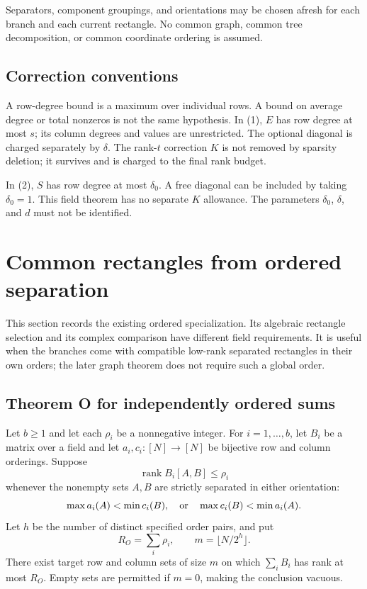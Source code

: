 \documentclass[
  11pt,
]{article}
\begin{document}
Separators, component groupings, and orientations may be chosen afresh
for each branch and each current rectangle. No common graph, common tree
decomposition, or common coordinate ordering is assumed.

\subsection{Correction conventions}\label{correction-conventions}

A row-degree bound is a maximum over individual rows. A bound on average
degree or total nonzeros is not the same hypothesis. In (1), \(E\) has
row degree at most \(s\); its column degrees and values are
unrestricted. The optional diagonal is charged separately by \(\delta\).
The rank-\(t\) correction \(K\) is not removed by sparsity deletion; it
survives and is charged to the final rank budget.

In (2), \(S\) has row degree at most \(\delta_0\). A free diagonal can
be included by taking \(\delta_0=1\). This field theorem has no separate
\(K\) allowance. The parameters \(\delta_0\), \(\delta\), and \(d\) must
not be identified.

\section{Common rectangles from ordered
separation}\label{common-rectangles-from-ordered-separation}

This section records the existing ordered specialization. Its algebraic
rectangle selection and its complex comparison have different field
requirements. It is useful when the branches come with compatible
low-rank separated rectangles in their own orders; the later graph
theorem does not require such a global order.

\subsection{Theorem O for independently ordered
sums}\label{theorem-o-for-independently-ordered-sums}

Let \(b\ge1\) and let each \(\rho_i\) be a nonnegative integer. For
\(i=1,\ldots,b\), let \(B_i\) be a matrix over a field and let
\(a_i,c_i:[N]\to[N]\) be bijective row and column orderings. Suppose \[
 \operatorname{rank}B_i[A,B]\le \rho_i
\] whenever the nonempty sets \(A,B\) are strictly separated in either
orientation: \[
 \max a_i(A)<\min c_i(B),\quad\hbox{or}\quad
 \max c_i(B)<\min a_i(A).
\] Let \(h\) be the number of distinct specified order pairs, and put \[
 R_O=\sum_i\rho_i,\qquad m=\lfloor N/2^h\rfloor.
\] There exist target row and column sets of size \(m\) on which
\(\sum_iB_i\) has rank at most \(R_O\). Empty sets are permitted if
\(m=0\), making the conclusion vacuous.
\end{document}
